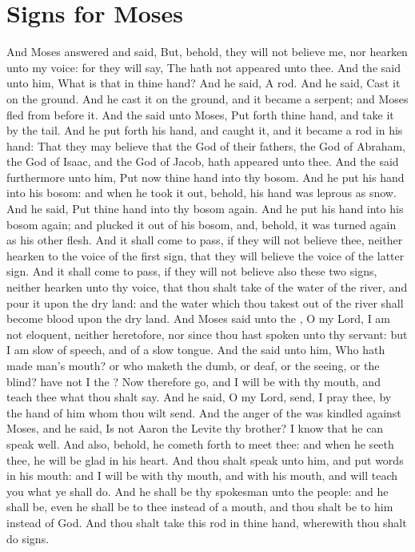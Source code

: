 \section*{Signs for Moses}
\begin{biblechapter} %
\verse And Moses answered and said, But, behold, they will not believe me, nor hearken unto my voice: for they will say, The \LORD hath not appeared unto thee.
\verse And the \LORD said unto him, What is that in thine hand? And he said, A rod.
\verse And he said, Cast it on the ground. And he cast it on the ground, and it became a serpent; and Moses fled from before it.
\verse And the \LORD said unto Moses, Put forth thine hand, and take it by the tail. And he put forth his hand, and caught it, and it became a rod in his hand:
\verse That they may believe that the \LORD God of their fathers, the God of Abraham, the God of Isaac, and the God of Jacob, hath appeared unto thee.
\verse And the \LORD said furthermore unto him, Put now thine hand into thy bosom. And he put his hand into his bosom: and when he took it out, behold, his hand was leprous as snow.
\verse And he said, Put thine hand into thy bosom again. And he put his hand into his bosom again; and plucked it out of his bosom, and, behold, it was turned again as his other flesh.
\verse And it shall come to pass, if they will not believe thee, neither hearken to the voice of the first sign, that they will believe the voice of the latter sign.
\verse And it shall come to pass, if they will not believe also these two signs, neither hearken unto thy voice, that thou shalt take of the water of the river, and pour it upon the dry land: and the water which thou takest out of the river shall become blood upon the dry land.
\verse And Moses said unto the \LORD, O my Lord, I am not eloquent, neither heretofore, nor since thou hast spoken unto thy servant: but I am slow of speech, and of a slow tongue.
\verse And the \LORD said unto him, Who hath made man's mouth? or who maketh the dumb, or deaf, or the seeing, or the blind? have not I the \LORD?
\verse Now therefore go, and I will be with thy mouth, and teach thee what thou shalt say.
\verse And he said, O my Lord, send, I pray thee, by the hand of him whom thou wilt send.
\verse And the anger of the \LORD was kindled against Moses, and he said, Is not Aaron the Levite thy brother? I know that he can speak well. And also, behold, he cometh forth to meet thee: and when he seeth thee, he will be glad in his heart.
\verse And thou shalt speak unto him, and put words in his mouth: and I will be with thy mouth, and with his mouth, and will teach you what ye shall do.
\verse And he shall be thy spokesman unto the people: and he shall be, even he shall be to thee instead of a mouth, and thou shalt be to him instead of God.
\verse And thou shalt take this rod in thine hand, wherewith thou shalt do signs.

\end{biblechapter}
